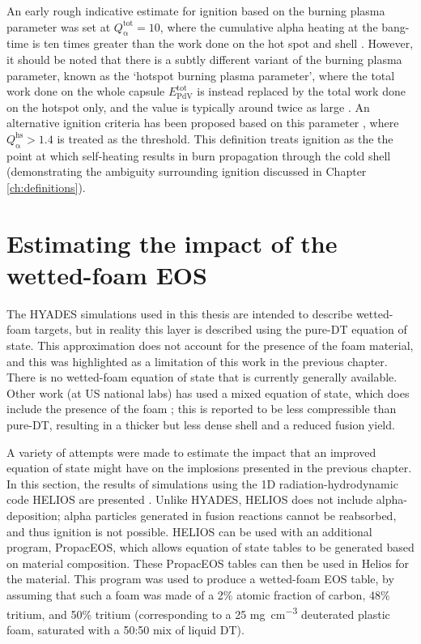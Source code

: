 An early rough indicative estimate for ignition based on the burning plasma parameter was set at $Q^\mathrm{{tot}}_{\mathrm{\alpha}} = 10$, where the cumulative alpha heating at the bang-time is ten times greater than the work done on the hot spot and shell \cite{Betti2011}. However, it should be noted that there is a subtly different variant of the burning plasma parameter, known as the `hotspot burning plasma parameter', where the total work done on the whole capsule $E^\mathrm{{tot}}_{\mathrm{PdV}}$ is instead replaced by the total work done on the hotspot only, and the value is typically around twice as large \cite{Betti2015}. An alternative ignition criteria has been proposed based on this parameter \cite{Christopherson2020}, where $Q^\mathrm{{hs}}_{\mathrm{\alpha}} > 1.4$ is treated as the threshold. This definition treats ignition as the the point at which self-heating results in burn propagation through the cold shell (demonstrating the ambiguity surrounding ignition discussed in Chapter \ref{ch:definitions}).

\section{Estimating the impact of the wetted-foam EOS} \label{sec:MixedEOS}

The HYADES simulations used in this thesis are intended to describe wetted-foam targets, but in reality this layer is described using the pure-DT equation of state. This approximation does not account for the presence of the foam material, and this was highlighted as a limitation of this work in the previous chapter. There is no wetted-foam equation of state that is currently generally available. Other work (at US national labs) has used a mixed equation of state, which does include the presence of the foam \cite{Olson2021}; this is reported to be less compressible than pure-DT, resulting in a thicker but less dense shell and a reduced fusion yield.

A variety of attempts were made to estimate the impact that an improved equation of state might have on the implosions presented in the previous chapter. In this section, the results of simulations using the 1D radiation-hydrodynamic code HELIOS are presented \cite{MacFarlane2006}. Unlike HYADES, HELIOS does not include alpha-deposition; alpha particles generated in fusion reactions cannot be reabsorbed, and thus ignition is not possible. HELIOS can be used with an additional program, PropacEOS, which allows equation of state tables to be generated based on material composition. These PropacEOS tables can then be used in Helios for the material. This program was used to produce a wetted-foam EOS table, by assuming that such a foam was made of a 2\% atomic fraction of carbon, 48\% tritium, and 50\% tritium (corresponding to a 25 \unit{\milli\gram\per\centi\meter\cubed} deuterated plastic foam, saturated with a 50:50 mix of liquid DT).

